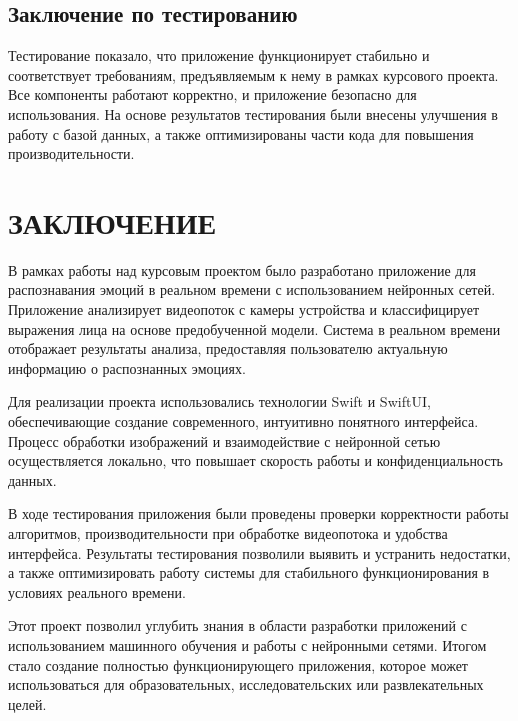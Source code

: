 {\subsection{Заключение по тестированию}

Тестирование показало, что приложение функционирует стабильно и соответствует требованиям, предъявляемым к нему в рамках курсового проекта. Все компоненты работают корректно, и приложение безопасно для использования. На основе результатов тестирования были внесены улучшения в работу с базой данных, а также оптимизированы части кода для повышения производительности.

\newpage

\section*{\MakeUppercase{Заключение}}
{
    В рамках работы над курсовым проектом было разработано приложение для распознавания эмоций в реальном времени с использованием нейронных сетей. Приложение анализирует видеопоток с камеры устройства и классифицирует выражения лица на основе предобученной модели. Система в реальном времени отображает результаты анализа, предоставляя пользователю актуальную информацию о распознанных эмоциях.

    Для реализации проекта использовались технологии Swift и SwiftUI, обеспечивающие создание современного, интуитивно понятного интерфейса. Процесс обработки изображений и взаимодействие с нейронной сетью осуществляется локально, что повышает скорость работы и конфиденциальность данных.
    
    В ходе тестирования приложения были проведены проверки корректности работы алгоритмов, производительности при обработке видеопотока и удобства интерфейса. Результаты тестирования позволили выявить и устранить недостатки, а также оптимизировать работу системы для стабильного функционирования в условиях реального времени.
    
    Этот проект позволил углубить знания в области разработки приложений с использованием машинного обучения и работы с нейронными сетями. Итогом стало создание полностью функционирующего приложения, которое может использоваться для образовательных, исследовательских или развлекательных целей.
}
\newpage


}
